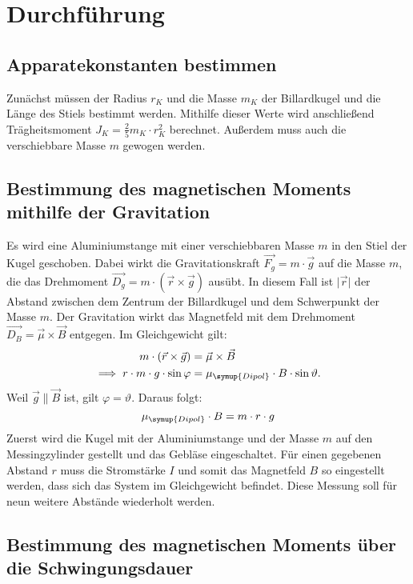 \section{Durchführung \cite{sample}}

\subsection{Apparatekonstanten bestimmen}

Zunächst müssen der Radius $r_K$ und die Masse $m_K$ der Billardkugel und die Länge des Stiels bestimmt werden.
Mithilfe dieser Werte wird anschließend Trägheitsmoment $J_K = \frac{2}{5} m_K \cdot r_K^2$ berechnet.
Außerdem muss auch die verschiebbare Masse $m$ gewogen werden.

\subsection{Bestimmung des magnetischen Moments mithilfe der Gravitation \label{sec:grav}}

Es wird eine Aluminiumstange mit einer verschiebbaren Masse $m$ in den Stiel der Kugel geschoben.
Dabei wirkt die Gravitationskraft $\vec{F_{\!\! g}} = m \cdot \vec{g}$ auf die Masse $m$,
die das Drehmoment $\vec{D_{\!\! g}} = m \cdot (\vec{r} \times \vec{g})$ ausübt.
In diesem Fall ist $\lvert \vec{r} \rvert$ der Abstand zwischen dem Zentrum der Billardkugel
und dem Schwerpunkt der Masse $m$.
Der Gravitation wirkt das Magnetfeld mit dem Drehmoment $\vec{D_{\!B}} = \vec{\mu} \times \vec{B}$ entgegen.
Im Gleichgewicht gilt:
\begin{align}
  m \cdot (\vec{r} \times \vec{g}) &= \vec{\mu} \times \vec{B} \\
   \implies r \cdot m \cdot g \cdot \sin{\varphi} &= \mu_{\symup{Dipol}} \cdot B \cdot \sin{\vartheta}.
\end{align}
Weil $\vec{g} \parallel \vec{B}$ ist, gilt $\varphi = \vartheta$. Daraus folgt:
\begin{equation}
  \mu_{\symup{Dipol}} \cdot B = m \cdot r \cdot g
  \label{eqn:mygrav}
\end{equation}
Zuerst wird die Kugel mit der Aluminiumstange und der Masse $m$ auf den Messingzylinder gestellt und
das Gebläse eingeschaltet.
Für einen gegebenen Abstand $r$ muss die Stromstärke $I$ und somit das Magnetfeld $B$ so eingestellt werden,
dass sich das System im Gleichgewicht befindet. Diese Messung soll für neun weitere Abstände wiederholt werden.

\subsection{Bestimmung des magnetischen Moments über die Schwingungsdauer \label{sec:schw}}

